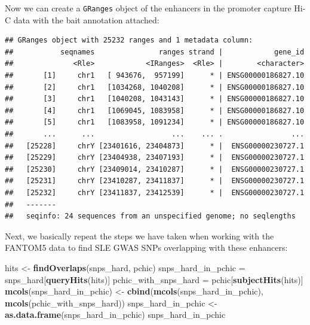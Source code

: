 \documentclass[9pt,a4paper,]{extarticle}
\newenvironment{Shaded}{\begin{snugshade}}{\end{snugshade}}
\newcommand{\KeywordTok}[1]{\textcolor[rgb]{0.13,0.29,0.53}{\textbf{#1}}}
\newcommand{\DataTypeTok}[1]{\textcolor[rgb]{0.13,0.29,0.53}{#1}}
\newcommand{\StringTok}[1]{\textcolor[rgb]{0.31,0.60,0.02}{#1}}
\newcommand{\OperatorTok}[1]{\textcolor[rgb]{0.81,0.36,0.00}{\textbf{#1}}}
\newcommand{\NormalTok}[1]{#1}
\begin{document}
Now we can create a \texttt{GRanges} object of the enhancers in the promoter capture Hi-C data with the bait annotation attached:

\begin{Shaded}
\end{Shaded}

\begin{verbatim}
## GRanges object with 25232 ranges and 1 metadata column:
##           seqnames               ranges strand |            gene_id
##              <Rle>            <IRanges>  <Rle> |        <character>
##       [1]     chr1   [ 943676,  957199]      * | ENSG00000186827.10
##       [2]     chr1   [1034268, 1040208]      * | ENSG00000186827.10
##       [3]     chr1   [1040208, 1043143]      * | ENSG00000186827.10
##       [4]     chr1   [1069045, 1083958]      * | ENSG00000186827.10
##       [5]     chr1   [1083958, 1091234]      * | ENSG00000186827.10
##       ...      ...                  ...    ... .                ...
##   [25228]     chrY [23401616, 23404873]      * |  ENSG00000230727.1
##   [25229]     chrY [23404938, 23407193]      * |  ENSG00000230727.1
##   [25230]     chrY [23409014, 23410287]      * |  ENSG00000230727.1
##   [25231]     chrY [23410287, 23411837]      * |  ENSG00000230727.1
##   [25232]     chrY [23411837, 23412539]      * |  ENSG00000230727.1
##   -------
##   seqinfo: 24 sequences from an unspecified genome; no seqlengths
\end{verbatim}

Next, we basically repeat the steps we have taken when working with the FANTOM5 data to find SLE GWAS SNPs overlapping with these enhancers:

\begin{Shaded}
\begin{Highlighting}[]
\NormalTok{hits <-}\StringTok{ }\KeywordTok{findOverlaps}\NormalTok{(snps_hard, pchic)}
\NormalTok{snps_hard_in_pchic =}\StringTok{ }\NormalTok{snps_hard[}\KeywordTok{queryHits}\NormalTok{(hits)]}
\NormalTok{pchic_with_snps_hard =}\StringTok{ }\NormalTok{pchic[}\KeywordTok{subjectHits}\NormalTok{(hits)]}
\KeywordTok{mcols}\NormalTok{(snps_hard_in_pchic) <-}\StringTok{ }\KeywordTok{cbind}\NormalTok{(}\KeywordTok{mcols}\NormalTok{(snps_hard_in_pchic), }\KeywordTok{mcols}\NormalTok{(pchic_with_snps_hard))}
\NormalTok{snps_hard_in_pchic <-}\StringTok{ }\KeywordTok{as.data.frame}\NormalTok{(snps_hard_in_pchic)}
\NormalTok{snps_hard_in_pchic}
\end{Highlighting}
\end{Shaded}
\end{document}
